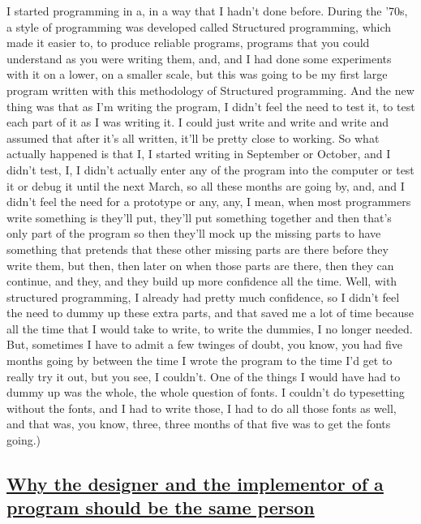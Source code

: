 \documentclass[]{article}
\begin{document}
I started programming in a, in a way that I hadn't done before. During
the '70s, a style of programming was developed called Structured
programming, which made it easier to, to produce reliable programs,
programs that you could understand as you were writing them, and, and I
had done some experiments with it on a lower, on a smaller scale, but
this was going to be my first large program written with this
methodology of Structured programming. And the new thing was that as I'm
writing the program, I didn't feel the need to test it, to test each
part of it as I was writing it. I could just write and write and write
and assumed that after it's all written, it'll be pretty close to
working. So what actually happened is that I, I started writing in
September or October, and I didn't test, I, I didn't actually enter any
of the program into the computer or test it or debug it until the next
March, so all these months are going by, and, and I didn't feel the need
for a prototype or any, any, I mean, when most programmers write
something is they'll put, they'll put something together and then that's
only part of the program so then they'll mock up the missing parts to
have something that pretends that these other missing parts are there
before they write them, but then, then later on when those parts are
there, then they can continue, and they, and they build up more
confidence all the time. Well, with structured programming, I already
had pretty much confidence, so I didn't feel the need to dummy up these
extra parts, and that saved me a lot of time because all the time that I
would take to write, to write the dummies, I no longer needed. But,
sometimes I have to admit a few twinges of doubt, you know, you had five
months going by between the time I wrote the program to the time I'd get
to really try it out, but you see, I couldn't. One of the things I would
have had to dummy up was the whole, the whole question of fonts. I
couldn't do typesetting without the fonts, and I had to write those, I
had to do all those fonts as well, and that was, you know, three, three
months of that five was to get the fonts going.)

\subsection{\texorpdfstring{\href{http://webofstories.com/play/17117}{Why
the designer and the implementor of a program should be the same
person}}{Why the designer and the implementor of a program should be the same person}}\label{why-the-designer-and-the-implementor-of-a-program-should-be-the-same-person}
\end{document}
